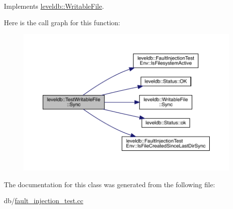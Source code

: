 Implements \mbox{\hyperlink{classleveldb_1_1_writable_file_a2d2dcef02a2c9e71f3d39125bcd5a606}{leveldb\+::\+Writable\+File}}.

Here is the call graph for this function\+:
\nopagebreak
\begin{figure}[H]
\begin{center}
\leavevmode
\includegraphics[width=350pt]{classleveldb_1_1_test_writable_file_aae96a812f1f2e82563b0900dfffaf1d1_cgraph}
\end{center}
\end{figure}


The documentation for this class was generated from the following file\+:\begin{DoxyCompactItemize}
\item 
db/\mbox{\hyperlink{fault__injection__test_8cc}{fault\+\_\+injection\+\_\+test.\+cc}}\end{DoxyCompactItemize}
